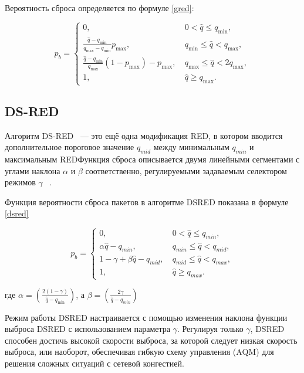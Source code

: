 Вероятность сброса определяется по формуле \eqref{gred}:

\begin{equation}
\label{gred}
p_{b} =\begin{cases}
        0, &  \  0 < \hat{q} \leqslant q_{\min}, 
        \\
        \frac{\hat{q} - q_{\min}}{q_{\max} - q_{\min}} p_{\max}, & \ q_{\min} \leqslant \hat{q} < q_{\max}, 
        \\
        \frac{\hat{q} - q_{\min}}{q_{\max}}(1-p_{\max}) - p_{\max}, & \ q_{\max} \leqslant \hat{q} < 2q_{\max}, 
        \\
        1, &  \ \hat{q} \geqslant  q_{\max}.
\end{cases}
\end{equation}


\subsection{DS-RED}

Алгоритм DS-RED ~--- это ещё одна модификация RED, в котором вводится дополнительное пороговое значение $q_{mid}$ между минимальным $q_{min}$ и максимальным
REDФункция сброса описывается двумя линейными сегментами с углами наклона $\alpha $ и $\beta $ соответственно, регулируемыми
задаваемым селектором режимов $\gamma$ ~\cite{DSRED}. 

Функция вероятности сброса пакетов в алгоритме DSRED показана в формуле \eqref{dsred}

\begin{equation}
\label{dsred}
p_{b} =\begin{cases}
        0, &  \  0 < \hat{q} \leqslant q_{min}, 
        \\
        \alpha{\hat{q} - q_{min}}, & \ q_{min} \leqslant \hat{q} < q_{mid}, 
        \\
        1 - \gamma + \beta{\hat{q} - q_{mid}}, & \ q_{mid} \leqslant \hat{q} < q_{max}, 
        \\
        1, &  \ \hat{q} \geqslant  q_{max}.
\end{cases}
\end{equation}

где $\alpha = (\frac{2(1 - \gamma)}{\hat{q} - q_{\min}})$, а $\beta = (\frac{2\gamma}{\hat{q} - q_{min}})$

Режим работы DSRED настраивается с помощью изменения наклона функции выброса DSRED с использованием параметра $\gamma$. Регулируя только $\gamma$, DSRED способен достичь высокой скорости выброса, за которой следует низкая скорость выброса, или наоборот, обеспечивая гибкую схему управления (AQM) для решения сложных ситуаций с сетевой конгестией.  

